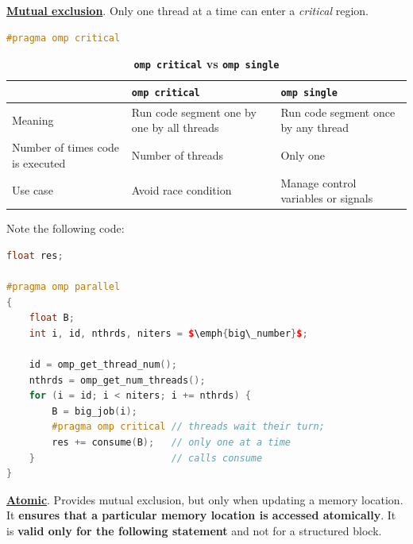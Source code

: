 \highspace
\textbf{\underline{Mutual exclusion}}. Only one thread at a time can enter a \emph{critical} region.
\begin{openmpbox}
    \begin{lstlisting}[language=C++]
#pragma omp critical\end{lstlisting}
\end{openmpbox}
\begin{table}[!htp]
    \centering
    \begin{tabular}{@{} p{8em} | p{12em} | p{12em} @{}}
        \toprule
        & \texttt{omp critical} & \texttt{omp single} \\
        \midrule
        Meaning & Run code segment one by one by all threads & Run code segment once by any thread \\
        \cmidrule{1-3}
        Number of times code is executed & Number of threads & Only one \\
        \cmidrule{1-3}
        Use case & Avoid race condition & Manage control variables or signals \\
        \bottomrule
    \end{tabular}
    \caption{\textcolor{Red2}{ \textbf{\texttt{omp critical} vs \texttt{omp single}}}}
\end{table}
\begin{examplebox}
    Note the following code:
    \begin{lstlisting}[language=C++, mathescape=true]
float res;

#pragma omp parallel
{
    float B;
    int i, id, nthrds, niters = $\emph{big\_number}$;

    id = omp_get_thread_num();
    nthrds = omp_get_num_threads();
    for (i = id; i < niters; i += nthrds) {
        B = big_job(i);
        #pragma omp critical // threads wait their turn;
        res += consume(B);   // only one at a time
    }                        // calls consume
}
    \end{lstlisting}
\end{examplebox}

\highspace
\textbf{\underline{Atomic}}. Provides mutual exclusion, but only when updating a memory location. It \textbf{ensures that a particular memory location is accessed atomically}. It is \textbf{valid only for the following statement} and not for a structured block.

